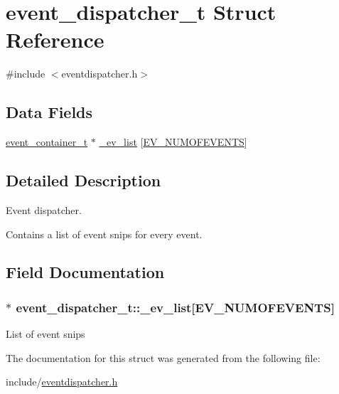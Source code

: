 \hypertarget{structevent__dispatcher__t}{}\section{event\+\_\+dispatcher\+\_\+t Struct Reference}
\label{structevent__dispatcher__t}


{\ttfamily \#include $<$eventdispatcher.\+h$>$}

\subsection*{Data Fields}
\begin{DoxyCompactItemize}
\item 
\hyperlink{structevent__container__t}{event\+\_\+container\+\_\+t} $\ast$ \hyperlink{structevent__dispatcher__t_a43b47329e5ca364167439001c76a781a}{\+\_\+ev\+\_\+list} \mbox{[}\hyperlink{eventdispatcher_8h_a2fb9b58e4e5f14f40af8b4a1425841f8a47f5fbee1bafda11f2f514e688f146c8}{E\+V\+\_\+\+N\+U\+M\+O\+F\+E\+V\+E\+N\+TS}\mbox{]}
\end{DoxyCompactItemize}


\subsection{Detailed Description}
Event dispatcher.

Contains a list of event snips for every event. 

\subsection{Field Documentation}
\subsubsection[{\texorpdfstring{\+\_\+ev\+\_\+list}{\_ev\_list}}]{$\ast$ event\+\_\+dispatcher\+\_\+t\+::\+\_\+ev\+\_\+list\mbox{[}{\bf E\+V\+\_\+\+N\+U\+M\+O\+F\+E\+V\+E\+N\+TS}\mbox{]}}\hypertarget{structevent__dispatcher__t_a43b47329e5ca364167439001c76a781a}{}\label{structevent__dispatcher__t_a43b47329e5ca364167439001c76a781a}
List of event snips 

The documentation for this struct was generated from the following file\+:\begin{DoxyCompactItemize}
\item 
include/\hyperlink{eventdispatcher_8h}{eventdispatcher.\+h}\end{DoxyCompactItemize}
